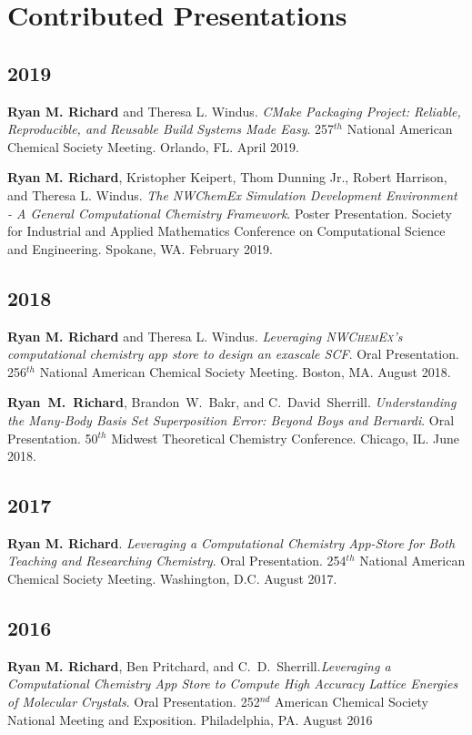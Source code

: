 \documentclass[11pt,a4paper,sans]{moderncv}
\begin{document}
\section{Contributed Presentations}
\vspace{5pt}
\begin{etaremune}
	\item[]{}
	\subsection{2019}
	\item{\textbf{Ryan M. Richard} and Theresa L. Windus. \textit{CMake Packaging Project: Reliable, Reproducible, and Reusable Build Systems Made Easy}. 257$^{th}$ National American Chemical Society Meeting. Orlando, FL. April 2019.}
	\item{\textbf{Ryan M. Richard}, Kristopher Keipert, Thom Dunning Jr., Robert Harrison, and Theresa L. Windus. \textit{The NWChemEx Simulation Development Environment - A General Computational Chemistry Framework}. Poster Presentation. Society for Industrial and Applied Mathematics Conference on Computational Science and Engineering. Spokane, WA. February 2019.}
	\subsection{2018}
	\item{\textbf{Ryan M. Richard} and Theresa L. Windus. \textit{Leveraging \textsc{NWChemEx}'s computational chemistry app store to design an exascale {SCF}}. Oral Presentation. 256$^{th}$ National American Chemical Society Meeting. Boston, MA. August 2018.}
	\item{\textbf{Ryan~M.~Richard}, Brandon~W.~Bakr, and C.~David~Sherrill. \textit{Understanding the Many-Body Basis Set Superposition Error: Beyond Boys and Bernardi}.  Oral Presentation. 50$^{th}$ Midwest Theoretical Chemistry Conference. Chicago, IL. June 2018.}
	\subsection{2017}
	\item{\textbf{Ryan M. Richard}. \textit{Leveraging a Computational Chemistry App-Store for Both Teaching and Researching Chemistry}. Oral Presentation. 254$^{th}$ National American Chemical Society Meeting.  Washington, D.C. August 2017.}
	\subsection{2016}
	\item{\textbf{Ryan M. Richard}, Ben Pritchard, and C.~D.~Sherrill.\textit{Leveraging a Computational Chemistry App Store to
			Compute High Accuracy Lattice Energies of Molecular
			Crystals}.  Oral Presentation.  252$^{nd}$ American Chemical Society National Meeting and Exposition.  Philadelphia, PA. August 2016}


\end{etaremune}
\end{document}
